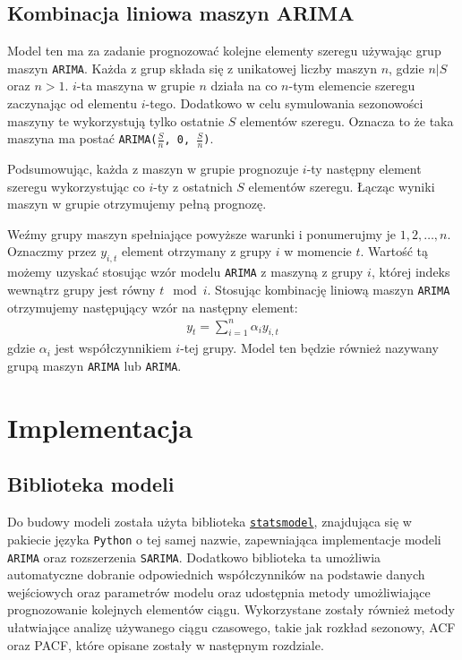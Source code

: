 \documentclass[12pt]{article}
\begin{document}
\subsection{Kombinacja liniowa maszyn ARIMA}
\label{group-arima}

Model ten ma za zadanie prognozować kolejne elementy szeregu używając grup maszyn \texttt{ARIMA}. Każda z grup składa się z unikatowej liczby maszyn $n$, gdzie $n|S$ oraz $n > 1$. $i$-ta maszyna w grupie $n$ działa na co $n$-tym elemencie szeregu zaczynając od elementu $i$-tego. Dodatkowo w celu symulowania sezonowości maszyny te wykorzystują tylko ostatnie $S$ elementów szeregu. Oznacza to że taka maszyna ma postać \texttt{ARIMA($\frac{S}{n}$, 0, $\frac{S}{n}$)}.

Podsumowując, każda z maszyn w grupie prognozuje $i$-ty następny element szeregu wykorzystując co $i$-ty z ostatnich $S$ elementów szeregu. Łącząc wyniki maszyn w grupie otrzymujemy pełną prognozę.

Weźmy grupy maszyn spełniające powyższe warunki i ponumerujmy je $1, 2, \dots, n$. Oznaczmy przez $y_{i,t}$ element otrzymany z grupy $i$ w momencie $t$. Wartość tą możemy uzyskać stosując wzór modelu \texttt{ARIMA} z maszyną z grupy $i$, której indeks wewnątrz grupy jest równy $t \mod{i}$.
Stosując kombinację liniową maszyn \texttt{ARIMA} otrzymujemy następujący wzór na następny element:
\begin{gather*}
    y_t = \sum^n_{i=1}\alpha_iy_{i,t}
\end{gather*}
gdzie $\alpha_i$ jest współczynnikiem $i$-tej grupy. Model ten będzie również nazywany grupą maszyn \texttt{ARIMA} lub \texttt{ARIMA}.

\section{Implementacja}

\subsection{Biblioteka modeli}

Do budowy modeli została użyta biblioteka \href{https://www.statsmodels.org/stable/index.html}{\texttt{statsmodel}}, znajdująca się w pakiecie języka \texttt{Python} o tej samej nazwie, zapewniająca implementacje modeli \texttt{ARIMA} oraz rozszerzenia \texttt{SARIMA}. Dodatkowo biblioteka ta umożliwia automatyczne dobranie odpowiednich współczynników na podstawie danych wejściowych oraz parametrów modelu oraz udostępnia metody umożliwiające prognozowanie kolejnych elementów ciągu. Wykorzystane zostały również metody ułatwiające analizę używanego ciągu czasowego, takie jak rozkład sezonowy, ACF oraz PACF, które opisane zostały w następnym rozdziale.
\end{document}
